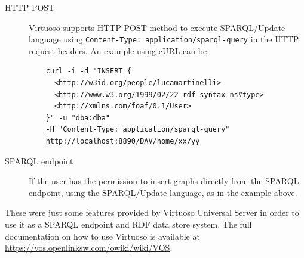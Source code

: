 \begin{description}
  \item[\ac{HTTP} POST] Virtuoso supports \ac{HTTP} POST method to execute \ac{SPARQL}/Update language using \verb#Content-Type: application/sparql-query# in the \ac{HTTP} request headers. An example using cURL can be:
  \begin{verbatim}
    curl -i -d "INSERT {
      <http://w3id.org/people/lucamartinelli>
      <http://www.w3.org/1999/02/22-rdf-syntax-ns#type>
      <http://xmlns.com/foaf/0.1/User>
    }" -u "dba:dba"
    -H "Content-Type: application/sparql-query"
    http://localhost:8890/DAV/home/xx/yy
  \end{verbatim}

  \item[\ac{SPARQL} endpoint] If the user has the permission to insert graphs directly from the \ac{SPARQL} endpoint, using the \ac{SPARQL}/Update language, as in the example above.
\end{description}

These were just some features provided by Virtuoso Universal Server in order to use it as a \ac{SPARQL} endpoint and \ac{RDF} data store system. The full documentation on how to use Virtuoso is available at \url{https://vos.openlinksw.com/owiki/wiki/VOS}.